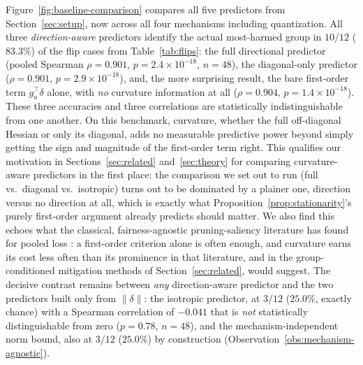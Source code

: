 \documentclass{article}
\begin{document}
Figure~\ref{fig:baseline-comparison} compares all five predictors from Section~\ref{sec:setup}, now across all four mechanisms including quantization. All three \emph{direction-aware} predictors identify the actual most-harmed group in $10/12$ ($83.3\%$) of the flip cases from Table~\ref{tab:flips}: the full directional predictor (pooled Spearman $\rho=0.901$, $p=2.4\times10^{-18}$, $n=48$), the diagonal-only predictor ($\rho=0.901$, $p=2.9\times10^{-18}$), and, the more surprising result, the bare first-order term $g_a^\top\delta$ alone, with \emph{no} curvature information at all ($\rho=0.904$, $p=1.4\times10^{-18}$). These three accuracies and three correlations are statistically indistinguishable from one another. On this benchmark, curvature, whether the full off-diagonal Hessian or only its diagonal, adds no measurable predictive power beyond simply getting the sign and magnitude of the first-order term right. This qualifies our motivation in Sections~\ref{sec:related} and~\ref{sec:theory} for comparing curvature-aware predictors in the first place: the comparison we set out to run (full vs.\ diagonal vs.\ isotropic) turns out to be dominated by a plainer one, direction versus no direction at all, which is exactly what Proposition~\ref{prop:stationarity}'s purely first-order argument already predicts should matter. We also find this echoes what the classical, fairness-agnostic pruning-saliency literature has found for pooled loss \citep{lee2019snip,molchanov2019importance}: a first-order criterion alone is often enough, and curvature earns its cost less often than its prominence in that literature, and in the group-conditioned mitigation methods of Section~\ref{sec:related}, would suggest. The decisive contrast remains between \emph{any} direction-aware predictor and the two predictors built only from $\|\delta\|$: the isotropic predictor, at $3/12$ ($25.0\%$, exactly chance) with a Spearman correlation of $-0.041$ that is \emph{not} statistically distinguishable from zero ($p=0.78$, $n=48$), and the mechanism-independent norm bound, also at $3/12$ ($25.0\%$) by construction (Observation~\ref{obs:mechanism-agnostic}).
\end{document}
